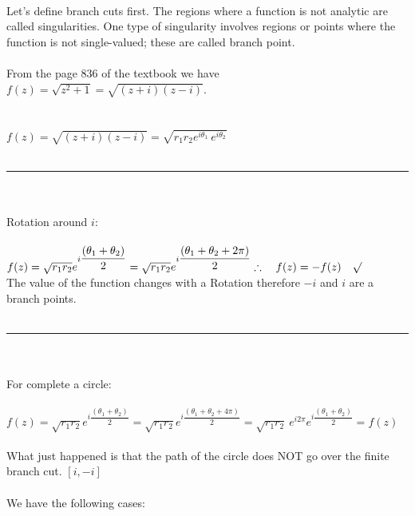 \documentclass[fleqn]{article}
\begin{document}
    \textcolor{hwColor}{
      \\
      \\
      \\
      Let's define branch cuts first. The regions where a function is not analytic are
      called singularities. One type of singularity involves regions or points where
      the function is not single-valued; these are called branch point. \\ \\
      From the page 836 of the textbook we have $f(z)=\sqrt{z^2+1}=\sqrt{(z+i)(z-i)}$. \\
      \\
      \\
      $
        f(z)=\sqrt{(z+i)(z-i)}=\sqrt{r_1 r_2 e^{i \theta_1} ~ e^{i \theta_2}}
      $
      \\
      \\
      \rule{15cm}{1pt}
      \\
      \\
      Rotation around $i$: \\
      \\
      $
        f(z)=\sqrt{r_1 r_2} e^{i\dfrac{(\theta_1+\theta_2)}{2}}=\sqrt{r_1 r_2} e^{i\dfrac{(\theta_1+\theta_2+2 \pi)}{2}} \\
        \\
        \\
        \therefore ~~~ f(z)=-f(z) ~~~ \surd \\
      $
      \\
      The value of the function changes with a Rotation therefore $-i$ and $i$ are a branch points. 
      \\
      \\
      \rule{15cm}{1pt}
      \\
      \\
      For complete a circle: \\
      \\
      $
        f(z)=\sqrt{r_1 r_2} e^{i\dfrac{(\theta_1+\theta_2)}{2}}=\sqrt{r_1 r_2} e^{i\dfrac{(\theta_1+\theta_2+4 \pi)}{2}}
        =\sqrt{r_1 r_2} ~ e^{i2 \pi} e^{i\dfrac{(\theta_1+\theta_2)}{2}}=f(z)
      $
      \\
      \\
      What just happened is that the path of the circle does NOT go over the finite branch cut. $[i,-i]$ \\
      \\
      We have the following cases: \\
}
\end{document}
